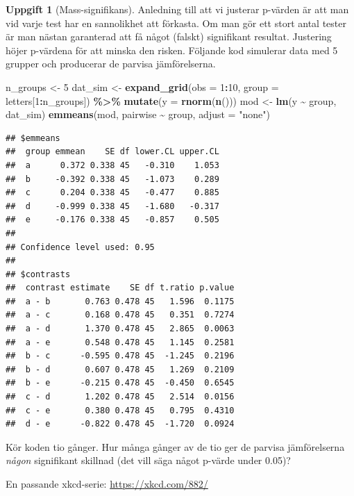 \documentclass[
]{book}
\newenvironment{Shaded}{\begin{snugshade}}{\end{snugshade}}
\newcommand{\AttributeTok}[1]{\textcolor[rgb]{0.13,0.29,0.53}{#1}}
\newcommand{\DecValTok}[1]{\textcolor[rgb]{0.00,0.00,0.81}{#1}}
\newcommand{\FunctionTok}[1]{\textcolor[rgb]{0.13,0.29,0.53}{\textbf{#1}}}
\newcommand{\NormalTok}[1]{#1}
\newcommand{\OtherTok}[1]{\textcolor[rgb]{0.56,0.35,0.01}{#1}}
\newcommand{\SpecialCharTok}[1]{\textcolor[rgb]{0.81,0.36,0.00}{\textbf{#1}}}
\newcommand{\StringTok}[1]{\textcolor[rgb]{0.31,0.60,0.02}{#1}}
\theoremstyle{definition}
\theoremstyle{definition}
\theoremstyle{definition}
\newtheorem{exercise}{Uppgift}[chapter]
\theoremstyle{definition}
\theoremstyle{remark}
\begin{document}
\begin{exercise}[Mass-signifikans]
Anledning till att vi justerar p-värden är att man vid varje test har en sannolikhet att förkasta. Om man gör ett stort antal tester är man nästan garanterad att få något (falskt) signifikant resultat. Justering höjer p-värdena för att minska den risken. Följande kod simulerar data med 5 grupper och producerar de parvisa jämförelserna.

\begin{Shaded}
\begin{Highlighting}[]
\NormalTok{n\_groups }\OtherTok{\textless{}{-}} \DecValTok{5}
\NormalTok{dat\_sim }\OtherTok{\textless{}{-}} \FunctionTok{expand\_grid}\NormalTok{(}\AttributeTok{obs =} \DecValTok{1}\SpecialCharTok{:}\DecValTok{10}\NormalTok{, }\AttributeTok{group =}\NormalTok{ letters[}\DecValTok{1}\SpecialCharTok{:}\NormalTok{n\_groups]) }\SpecialCharTok{\%\textgreater{}\%} \FunctionTok{mutate}\NormalTok{(}\AttributeTok{y =} \FunctionTok{rnorm}\NormalTok{(}\FunctionTok{n}\NormalTok{()))}
\NormalTok{mod }\OtherTok{\textless{}{-}} \FunctionTok{lm}\NormalTok{(y }\SpecialCharTok{\textasciitilde{}}\NormalTok{ group, dat\_sim)}
\FunctionTok{emmeans}\NormalTok{(mod, pairwise }\SpecialCharTok{\textasciitilde{}}\NormalTok{ group, }\AttributeTok{adjust =} \StringTok{"none"}\NormalTok{)}
\end{Highlighting}
\end{Shaded}

\begin{verbatim}
## $emmeans
##  group emmean    SE df lower.CL upper.CL
##  a      0.372 0.338 45   -0.310    1.053
##  b     -0.392 0.338 45   -1.073    0.289
##  c      0.204 0.338 45   -0.477    0.885
##  d     -0.999 0.338 45   -1.680   -0.317
##  e     -0.176 0.338 45   -0.857    0.505
## 
## Confidence level used: 0.95 
## 
## $contrasts
##  contrast estimate    SE df t.ratio p.value
##  a - b       0.763 0.478 45   1.596  0.1175
##  a - c       0.168 0.478 45   0.351  0.7274
##  a - d       1.370 0.478 45   2.865  0.0063
##  a - e       0.548 0.478 45   1.145  0.2581
##  b - c      -0.595 0.478 45  -1.245  0.2196
##  b - d       0.607 0.478 45   1.269  0.2109
##  b - e      -0.215 0.478 45  -0.450  0.6545
##  c - d       1.202 0.478 45   2.514  0.0156
##  c - e       0.380 0.478 45   0.795  0.4310
##  d - e      -0.822 0.478 45  -1.720  0.0924
\end{verbatim}

Kör koden tio gånger. Hur många gånger av de tio ger de parvisa jämförelserna \emph{någon} signifikant skillnad (det vill säga något p-värde under 0.05)?

En passande xkcd-serie: \url{https://xkcd.com/882/}
\end{exercise}
\end{document}
